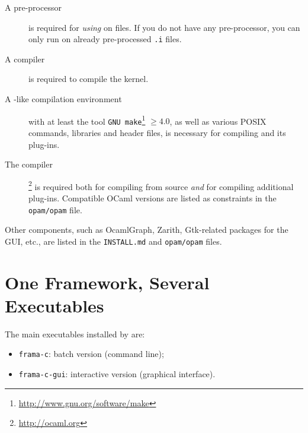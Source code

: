 \begin{description}
\item[A \C pre-processor] is required for \emph{using}
  \FramaC on \C files. If you do not have any \C pre-processor,
  you can only run \FramaC on already pre-processed \texttt{.i} files.
\item[A \C compiler] is required to compile the \FramaC
  kernel.
\item[A -like compilation environment] with at least the tool
  \texttt{GNU make}\footnote{\url{http://www.gnu.org/software/make}} $\ge 4.0$,
  as well as various POSIX commands, libraries and header files, is necessary
  for compiling \FramaC and its plug-ins.
\item[The \caml compiler]\footnote{\url{http://ocaml.org}}
  is required both for compiling \FramaC from source \emph{and} for compiling
  additional plug-ins. Compatible OCaml versions are listed as constraints in
  the \texttt{opam/opam} file.
\end{description}

Other components, such as OcamlGraph, Zarith, Gtk-related packages for the GUI,
etc., are listed in the \texttt{INSTALL.md} and \texttt{opam/opam} files.

\section{One Framework, Several Executables}\label{sec:modes}

The main executables installed by \FramaC are:

\begin{itemize}
\item \texttt{frama-c}: batch version (command line);
\item \texttt{frama-c-gui}: interactive version (graphical interface).
\end{itemize}


